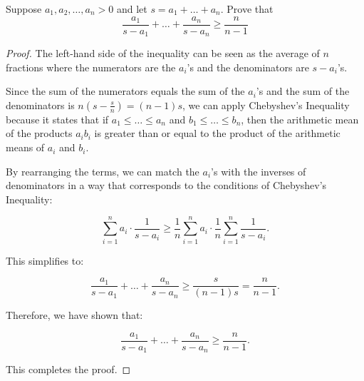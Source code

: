 \begin{exercise}
    Suppose \(a_1, a_2, \ldots, a_n > 0\) and let \(s = a_1 + \ldots + a_n\). Prove that
\[ \frac{a_1}{s - a_1} + \ldots + \frac{a_n}{s - a_n} \geq \frac{n}{n - 1} \]
\end{exercise}
\begin{proof}
    
    The left-hand side of the inequality can be seen as the average of \(n\) fractions where the numerators are the \(a_i\)'s and the denominators are \(s - a_i\)'s.
    
    Since the sum of the numerators equals the sum of the \(a_i\)'s and the sum of the denominators is \(n(s - \frac{s}{n}) = (n-1)s\), we can apply Chebyshev's Inequality because it states that if \(a_1 \leq \ldots \leq a_n\) and \(b_1 \leq \ldots \leq b_n\), then the arithmetic mean of the products \(a_ib_i\) is greater than or equal to the product of the arithmetic means of \(a_i\) and \(b_i\).
    
    By rearranging the terms, we can match the \(a_i\)'s with the inverses of denominators in a way that corresponds to the conditions of Chebyshev's Inequality:
    
    \[ \sum_{i=1}^n a_i \cdot \frac{1}{s - a_i} \geq \frac{1}{n} \sum_{i=1}^n a_i \cdot \frac{1}{n} \sum_{i=1}^n \frac{1}{s - a_i}. \]
    
    This simplifies to:
    
    \[ \frac{a_1}{s - a_1} + \ldots + \frac{a_n}{s - a_n} \geq \frac{s}{(n-1)s} = \frac{n}{n-1}. \]
    
    Therefore, we have shown that:
    
    \[ \frac{a_1}{s - a_1} + \ldots + \frac{a_n}{s - a_n} \geq \frac{n}{n - 1}. \]
    
    This completes the proof.
    
\end{proof}

